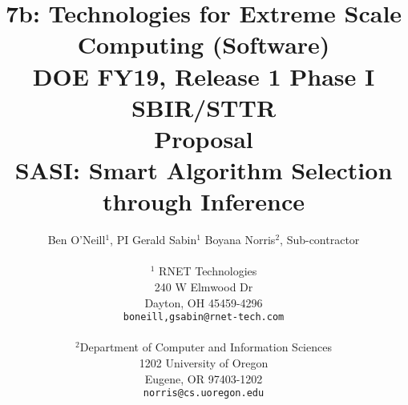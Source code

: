 \title{7b: Technologies for Extreme Scale Computing (Software)\\
DOE FY19, Release 1 Phase I SBIR/STTR \\
\vspace{0.25in}Proposal\\
\vspace{0.25in} SASI: Smart Algorithm Selection through Inference \\
\vspace{0.5in}}
\author{Ben O'Neill$^1$, PI \hspace{0.75in} Gerald Sabin$^1$ Boyana Norris$^2$, Sub-contractor\\
  \\$^1$ RNET Technologies\\
  240 W Elmwood Dr\\
  Dayton, OH 45459-4296\\
{\tt {boneill,gsabin}@rnet-tech.com}\\\\
$^2$Department of Computer and Information Sciences\\
  1202 University of Oregon\\
  Eugene, OR 97403-1202\\
  {\tt norris@cs.uoregon.edu}
}